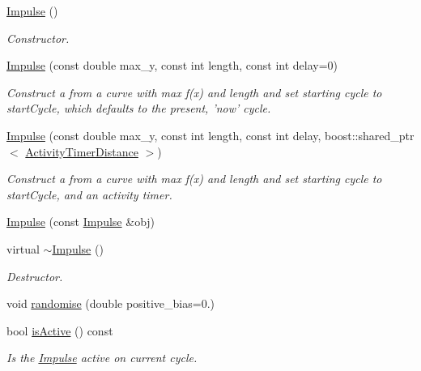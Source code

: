 \begin{DoxyCompactItemize}
\item 
\hyperlink{classcryomesh_1_1components_1_1Impulse_aff44f52a706b48a74fc34b3dc2e26d38}{\-Impulse} ()
\begin{DoxyCompactList}\small\item\em \-Constructor. \end{DoxyCompactList}\item 
\hyperlink{classcryomesh_1_1components_1_1Impulse_afd7597df2534ba3d0b7d91d3c0b64a55}{\-Impulse} (const double max\-\_\-y, const int length, const int delay=0)
\begin{DoxyCompactList}\small\item\em \-Construct a from a curve with max f(x) and length and set starting cycle to start\-Cycle, which defaults to the present, 'now' cycle. \end{DoxyCompactList}\item 
\hyperlink{classcryomesh_1_1components_1_1Impulse_a61915a9d92e7c7601be4a005794c0c89}{\-Impulse} (const double max\-\_\-y, const int length, const int delay, boost\-::shared\-\_\-ptr$<$ \hyperlink{classcryomesh_1_1components_1_1ActivityTimerDistance}{\-Activity\-Timer\-Distance} $>$)
\begin{DoxyCompactList}\small\item\em \-Construct a from a curve with max f(x) and length and set starting cycle to start\-Cycle, and an activity timer. \end{DoxyCompactList}\item 
\hyperlink{classcryomesh_1_1components_1_1Impulse_af9ec60048bf54aaf5ee3e93dd4b87f3d}{\-Impulse} (const \hyperlink{classcryomesh_1_1components_1_1Impulse}{\-Impulse} \&obj)
\item 
virtual \hyperlink{classcryomesh_1_1components_1_1Impulse_a3801df3c6dba70d0467f070fa346efa5}{$\sim$\-Impulse} ()
\begin{DoxyCompactList}\small\item\em \-Destructor. \end{DoxyCompactList}\item 
void \hyperlink{classcryomesh_1_1components_1_1Impulse_a5da6ee1f9d1be136d23c36c377258a4d}{randomise} (double positive\-\_\-bias=0.)
\item 
bool \hyperlink{classcryomesh_1_1components_1_1Impulse_a9c87bdf033d68e93204704078860aef6}{is\-Active} () const 
\begin{DoxyCompactList}\small\item\em \-Is the \hyperlink{classcryomesh_1_1components_1_1Impulse}{\-Impulse} active on current cycle. \end{DoxyCompactList}\item 

\end{DoxyCompactItemize}
